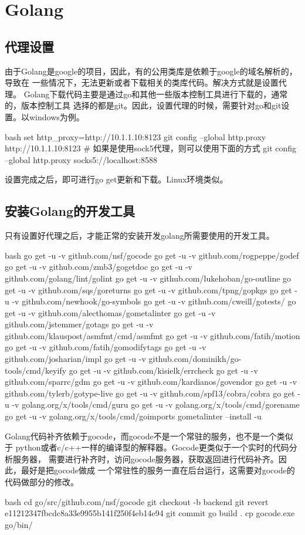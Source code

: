 \chapter{Golang}

\section{代理设置}
由于Golang是google的项目，因此，有的公用类库是依赖于google的域名解析的，导致在
一些情况下，无法更新或者下载相关的类库代码。解决方式就是设置代理。
Golang下载代码主要是通过go和其他一些版本控制工具进行下载的，通常的，版本控制工具
选择的都是git。因此，设置代理的时候，需要针对go和git设置。以windows为例。
\begin{code-block}{bash}
set http_proxy=http://10.1.1.10:8123
git config --global http.proxy http://10.1.1.10:8123
# 如果是使用sock5代理，则可以使用下面的方式
git config --global http.proxy socks5://localhost:8588
\end{code-block}

设置完成之后，即可进行go get更新和下载。Linux环境类似。

\section{安装Golang的开发工具}
只有设置好代理之后，才能正常的安装开发golang所需要使用的开发工具。
\begin{code-block}{bash}
go get -u -v github.com/nsf/gocode
go get -u -v github.com/rogpeppe/godef
go get -u -v github.com/zmb3/gogetdoc
go get -u -v github.com/golang/lint/golint
go get -u -v github.com/lukehoban/go-outline
go get -u -v github.com/sqs/goreturns
go get -u -v github.com/tpng/gopkgs
go get -u -v github.com/newhook/go-symbols
go get -u -v github.com/cweill/gotests/
go get -u -v github.com/alecthomas/gometalinter
go get -u -v github.com/jstemmer/gotags
go get -u -v github.com/klauspost/asmfmt/cmd/asmfmt
go get -u -v github.com/fatih/motion
go get -u -v github.com/fatih/gomodifytags
go get -u -v github.com/josharian/impl
go get -u -v github.com/dominikh/go-tools/cmd/keyify
go get -u -v github.com/kisielk/errcheck
go get -u -v github.com/sparrc/gdm
go get -u -v github.com/kardianos/govendor
go get -u -v github.com/tylerb/gotype-live
go get -u -v github.com/spf13/cobra/cobra
go get -u -v golang.org/x/tools/cmd/guru
go get -u -v golang.org/x/tools/cmd/gorename
go get -u -v golang.org/x/tools/cmd/goimports
gometalinter --install -u
\end{code-block}

Golang代码补齐依赖于gocode，而gocode不是一个常驻的服务，也不是一个类似于
python或者c/c++一样的编译型的解释器。Gocode更类似于一个实时的代码分析服务器，
需要进行补齐时，访问gocode服务器，获取返回进行代码补齐。因此，最好是把gocode做成
一个常驻性的服务一直在后台运行，这需要对gocode的代码做部分的修改。
\begin{code-block}{bash}
cd go/src/github.com/nsf/gocode
git checkout -b backend
git revert e11212347fbcdc8a33e9955b141f250f4eb14e94
git commit
go build .
cp gocode.exe go/bin/
\end{code-block}

